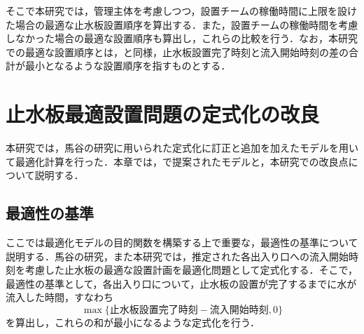\documentclass[a4paper,12pt,fleqn]{jarticle}
\begin{document}
そこで本研究では，管理主体を考慮しつつ，設置チームの稼働時間に上限を設けた場合の最適な止水板設置順序を算出する．また，設置チームの稼働時間を考慮しなかった場合の最適な設置順序も算出し，これらの比較を行う．なお，本研究での最適な設置順序とは，\cite{馬谷さん卒論}と同様，止水板設置完了時刻と流入開始時刻の差の合計が最小となるような設置順序を指すものとする．

  



\newpage
\section{止水板最適設置問題の定式化の改良}
本研究では，馬谷の研究\cite{馬谷さん卒論}に用いられた定式化に訂正と追加を加えたモデルを用いて最適化計算を行った．本章では，\cite{馬谷さん卒論}で提案されたモデルと，本研究での改良点について説明する．

\subsection{最適性の基準}
ここでは最適化モデルの目的関数を構築する上で重要な，最適性の基準について説明する．馬谷の研究\cite{馬谷さん卒論}，また本研究では，推定された各出入り口への流入開始時刻を考慮した止水板の最適な設置計画を最適化問題として定式化する．そこで，最適性の基準として，各出入り口について，止水板の設置が完了するまでに水が流入した時間，すなわち
\[
 \max\{\mbox{止水板設置完了時刻} - \mbox{流入開始時刻}, 0\}
\]
を算出し，これらの和が最小になるような定式化を行う．
\end{document}
